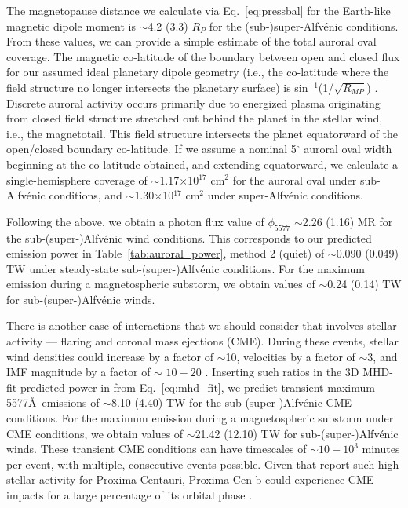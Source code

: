 \documentclass{emulateapj}
\newcommand{\XXX}[1]{#1}      %
\begin{document}
The magnetopause distance we calculate via Eq.~\ref{eq:pressbal} for the Earth-like magnetic dipole moment is \XXX{$\sim$4.2 (3.3) $R_P$ for the (sub-)super-Alfv\'{e}nic conditions. From these values}, we can provide a simple estimate of the total auroral oval coverage. The magnetic co-latitude of the boundary between open and closed flux \XXX{for our assumed ideal planetary dipole geometry (i.e., the co-latitude where the field structure no longer intersects the planetary surface)} is sin$^{-1}$(1/$\sqrt{R_{MP}}$) \XXX{\citep{Kivelson1995}}. \XXX{Discrete auroral activity occurs primarily due to energized plasma originating from closed field structure stretched out behind the planet in the stellar wind, i.e., the magnetotail. This field structure intersects the planet equatorward of the open/closed boundary co-latitude.} If we assume a nominal 5$^\circ$ auroral oval width \XXX{beginning at the co-latitude obtained, and extending equatorward, we calculate a single-hemisphere coverage of $\sim$1.17$\times$10$^{17}$ cm$^2$ for the auroral oval under sub-Alfv\'{e}nic conditions, and $\sim$1.30$\times$10$^{17}$ cm$^2$ under super-Alfv\'{e}nic conditions.}


Following the above, we obtain a photon flux value of \XXX{$\phi_{5577}$ $\sim$2.26 (1.16) MR for the sub-\mbox{(super-)}Alfv\'{e}nic wind conditions}. This corresponds to our predicted emission power in Table~\ref{tab:auroral_power}\XXX{, method 2 (quiet)} of \XXX{$\sim$0.090 (0.049) TW  under steady-state sub-\mbox{(super-)}Alfv\'{e}nic conditions. For the maximum emission during a magnetospheric substorm, we obtain values of $\sim$0.24 (0.14) TW for sub-\mbox{(super-)}Alfv\'{e}nic winds.}
 
There is another case of interactions that we should consider that involves stellar activity --- flaring and coronal mass ejections (CME). During these events, stellar wind densities could increase by a factor of $\sim$10, velocities by a factor of $\sim$3, and IMF magnitude by a factor of $\sim$ $10-20$ \citep{Khodachenko2007,Gopalswamy2009}. Inserting such ratios in the \XXX{3D MHD-fit predicted power in from Eq.~\ref{eq:mhd_fit}}, we predict transient maximum 5577\AA\ emissions of \XXX{$\sim$8.10 (4.40) TW for the sub-\mbox{(super-)}Alfv\'{e}nic CME conditions.} For the maximum emission during a magnetospheric substorm under CME conditions, we obtain values of \XXX{$\sim$21.42 (12.10) TW for sub-\mbox{(super-)}Alfv\'{e}nic winds.} These transient CME conditions can have timescales of ${\sim} 10-10^3$ minutes per event, with multiple, consecutive events possible. Given that \citet{Davenport2016} report such high stellar activity for Proxima Centauri, Proxima Cen b could experience CME impacts for a large percentage of its orbital phase \citep[e.g.,][]{Khodachenko2007}. 
\end{document}
